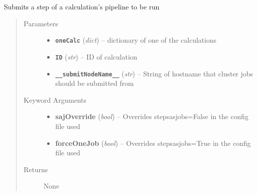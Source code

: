 \documentclass[letterpaper,10pt,english]{sphinxmanual}
\begin{document}
\begin{fulllineitems}
\label{run:run.__submitJob}
Submits a step of a calculation's pipeline to be run
\begin{quote}\begin{description}
\item[{Parameters}] \leavevmode\begin{itemize}
\item {} 
\textbf{\texttt{oneCalc}} (\emph{dict}) -- dictionary of one of the calculations

\item {} 
\textbf{\texttt{ID}} (\emph{str}) -- ID of calculation

\item {} 
\textbf{\texttt{\_\_submitNodeName\_\_}} (\emph{str}) -- String of hostname that cluster jobs should be submitted from

\end{itemize}

\item[{Keyword Arguments}] \leavevmode\begin{itemize}
\item {} 
\textbf{sajOverride} (\emph{bool}) --
Overrides stepsasjobs=False in the config file used

\item {} 
\textbf{forceOneJob} (\emph{bool}) --
Overrides stepsasjobs=True in the config file used

\end{itemize}

\item[{Returns}] \leavevmode
None

\end{description}\end{quote}

\end{fulllineitems}

\end{document}
